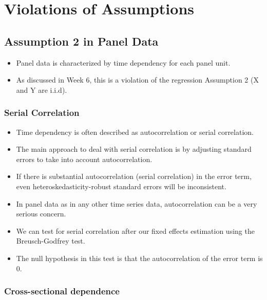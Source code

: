 \documentclass[]{article}
\theoremstyle{definition}
\theoremstyle{definition}
\theoremstyle{remark}
\begin{document}
\section{Violations of Assumptions}\label{violations-of-assumptions}

\subsection{Assumption 2 in Panel
Data}\label{assumption-2-in-panel-data}

\begin{itemize}
\item
  Panel data is characterized by time dependency for each panel unit.
\item
  As discussed in Week 6, this is a violation of the regression
  Assumption 2 (X and Y are i.i.d).
\end{itemize}

\subsubsection{Serial Correlation}\label{serial-correlation}

\begin{itemize}
\item
  Time dependency is often described as autocorrelation or serial
  correlation.
\item
  The main approach to deal with serial correlation is by adjusting
  standard errors to take into account autocorrelation.
\item
  If there is substantial autocorrelation (serial correlation) in the
  error term, even heteroskedasticity-robust standard errors will be
  inconsistent.
\item
  In panel data as in any other time series data, autocorrelation can be
  a very serious concern.
\item
  We can test for serial correlation after our fixed effects estimation
  using the Breusch-Godfrey test.
\item
  The null hypothesis in this test is that the autocorrelation of the
  error term is 0.
\end{itemize}

\subsubsection{Cross-sectional
dependence}\label{cross-sectional-dependence}
\end{document}
